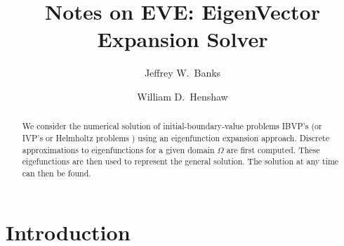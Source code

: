 \documentclass[preprint,11pt]{elsarticle}
\begin{document}
\begin{frontmatter}
 \title{Notes on EVE: EigenVector Expansion Solver}


\author[rpi]{Jeffrey W.~Banks}

\author[rpi]{William D.~Henshaw}



\address[rpi]{Department of Mathematical Sciences, Rensselaer Polytechnic Institute, Troy, NY 12180, USA}







\begin{abstract}

We consider the numerical solution of initial-boundary-value problems IBVP's (or IVP's or Helmholtz problems )
using an eigenfunction expansion approach.
Discrete approximations to eigenfunctions for a given domain $\Omega$ are first computed. These eigefunctions are then used to
represent the general solution. The solution at any time can then be found.


\end{abstract}

\end{frontmatter}


\tableofcontents

\section{Introduction} 
\end{document}
